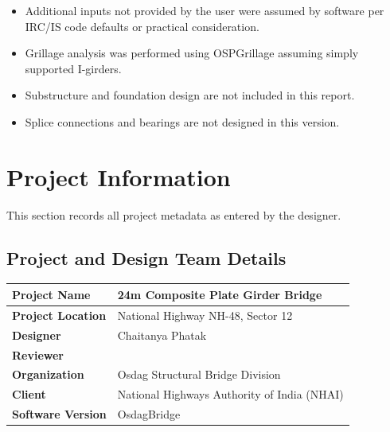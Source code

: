 \documentclass[12pt,a4paper]{report}
\numberwithin{table}{chapter}
\numberwithin{figure}{chapter}
\begin{document}
\begin{itemize}
\item Additional inputs not provided by the user were assumed by software per IRC/IS code defaults or practical consideration.
\item Grillage analysis was performed using OSPGrillage assuming simply supported I-girders.
\item Substructure and foundation design are not included in this report.
\item Splice connections and bearings are not designed in this version.
\end{itemize}

\titleformat{\chapter}[block]{\normalfont\Large\bfseries\centering}{\thechapter}{1em}{}
\titlespacing*{\chapter}{0pt}{-30pt}{10pt}


\chapter{Project Information}

This section records all project metadata as entered by the designer.

\section{Project and Design Team Details}
\label{sec:project-details}

\begin{tabular}{|L{5.5cm}|L{8.5cm}|}
\hline
\textbf{Project Name} & 24m Composite Plate Girder Bridge \\
\hline
\textbf{Project Location} & National Highway NH-48, Sector 12 \\
\hline
\textbf{Designer} & Chaitanya Phatak \\
\hline
\textbf{Reviewer} &  \\
\hline
\textbf{Organization} & Osdag Structural Bridge Division \\
\hline
\textbf{Client} & National Highways Authority of India (NHAI) \\
\hline
\textbf{Software Version} & OsdagBridge \\
\hline
\end{tabular}
\end{document}
